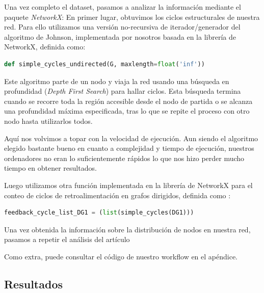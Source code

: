\documentclass[1p]{elsarticle}
\begin{document}
    Una vez completo el dataset, pasamos a analizar la información mediante el paquete \textit{NetworkX}:
	 En primer lugar, obtuvimos los ciclos estructurales de nuestra red. Para ello utilizamos una versión no-recursiva de iterador/generador del algoritmo de Johnson, implementada por nosotros basada en la librería de NetworkX, definida como:
\begin{lstlisting}[language=Python]
    def simple_cycles_undirected(G, maxlength=float('inf'))
\end{lstlisting}
    Este algoritmo parte de un nodo y viaja la red usando una búsqueda en profundidad (\textit{Depth First Search}) para hallar ciclos. Esta búsqueda termina cuando se recorre toda la región accesible desde el nodo de partida o se alcanza una profundidad máxima especificada, tras lo que se repite el proceso con otro nodo hasta utilizarlos todos.

    Aquí nos volvimos a topar con la velocidad de ejecución.
    Aun siendo el algoritmo elegido bastante bueno en cuanto a complejidad y tiempo de ejecución, nuestros ordenadores no eran lo suficientemente rápidos lo que nos hizo perder mucho tiempo en obtener resultados.

    Luego utilizamos otra función implementada en la librería de NetworkX para el conteo de ciclos de retroalimentación en grafos dirigidos, definida como :

\begin{lstlisting}[language=Python]
    feedback_cycle_list_DG1 = (list(simple_cycles(DG1)))
\end{lstlisting}

    Una vez obtenida la información sobre la distribución de nodos en nuestra red, pasamos a repetir el análisis del artículo 

    Como extra, puede consultar el código de nuestro workflow en el apéndice.


\subsection{Resultados}
\end{document}
